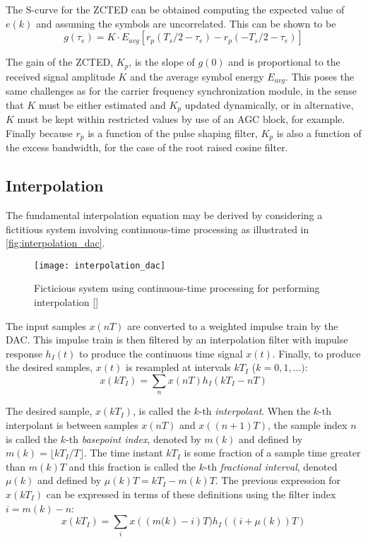 The S-curve for the ZCTED can be obtained computing the expected value of $e(k)$ and assuming the symbols are uncorrelated. This can be shown to be
\begin{equation}
g(\tau_e)=K\cdot E_{avg}\left[ r_p\left(T_s/2-\tau_e\right) - r_p\left(-T_s/2-\tau_e\right) \right]
\end{equation}

The gain of the ZCTED, $K_p$, is the slope of $g(0)$ and is proportional to the received signal amplitude $K$ and the average symbol energy $E_{avg}$. This poses the same challenges as for the carrier frequency synchronization module, in the sense that $K$ must be either estimated and $K_p$ updated dynamically, or in alternative, $K$ must be kept within restricted values by use of an AGC block, for example. Finally because $r_p$ is a function of the pulse shaping filter, $K_p$ is also a function of the excess bandwidth, for the case of the root raised cosine filter.

\subsection{Interpolation}

The fundamental interpolation equation may be derived by considering a fictitious system involving continuous-time processing as illustrated in \autoref{fig:interpolation_dac}.

\begin{figure}[H]
  \centering
  \texttt{[image: interpolation\_dac]}
  \caption{Ficticious system using continuous-time processing for performing interpolation [\citeauthor{digcomm_discrete_approach}]}
  \label{fig:interpolation_dac}
\end{figure}

The input samples $x(nT)$ are converted to a weighted impulse train by the DAC. This impulse train is then filtered by an interpolation filter with impulse response $h_I(t)$ to produce the continuous time signal $x(t)$. Finally, to produce the desired samples, $x(t)$ is resampled at intervals $kT_I$ ($k=0,1,\ldots)$:
\begin{equation}
x(kT_I)=\sum_{n} x(nT)h_I(kT_I-nT)
\end{equation}

The desired sample, $x(kT_I)$, is called the $k$-th \emph{interpolant}. When the $k$-th interpolant is between samples $x(nT)$ and $x((n+1)T)$, the sample index $n$ is called the $k$-th \emph{basepoint index}, denoted by $m(k)$ and defined by $m(k)=\lfloor kT_I/T \rfloor$. The time instant $kT_I$ is some fraction of a sample time greater than $m(k)T$ and this fraction is called the $k$-th \emph{fractional interval}, denoted $\mu(k)$ and defined by $\mu(k)T=kT_I-m(k)T$. The previous expression for $x(kT_I)$ can be expressed in terms of these definitions using the filter index $i=m(k)-n$:
\begin{equation}
x(kT_I)=\sum_{i} x\left(\left(m(k\right)-i\right)T)h_I\left(\left(i+\mu\left(k\right)\right)T\right)
\end{equation}

